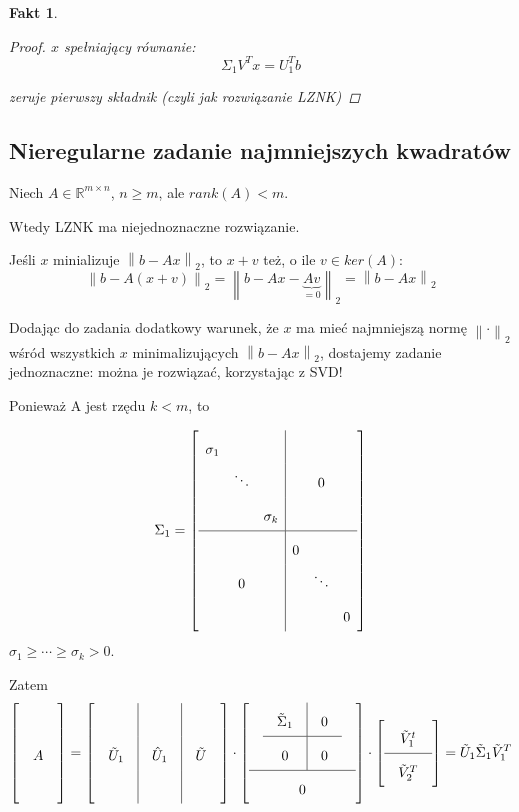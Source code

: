 \documentclass[hidelinks,a4paper,fleqn,oneside]{book}
\newcommand{\RR}{\mathbb{R}}
\newcommand{\norm}[1]{\left\lVert#1\right\rVert}
\newtheorem{fakt}{Fakt}
\begin{document}
\begin{fakt}
\begin{enumerate}
\begin{proof}
		      $x$ spełniający równanie:
		      \[
		      	\Sigma_1V^Tx = U_1^Tb
		      \]
		      
		      zeruje pierwszy składnik (czyli jak rozwiązanie LZNK)
		      \end{proof}
	\end{enumerate}
\end{fakt}

\subsection{Nieregularne zadanie najmniejszych kwadratów}

Niech $A \in \RR^{m \times n}$, $n \geq m$, ale $rank(A) < m$.

Wtedy LZNK ma niejednoznaczne rozwiązanie.

Jeśli $x$ minializuje $\norm{b - Ax}_2$, to $x+v$ też, o ile $v \in ker(A)$:
\[
	\norm{b - A(x + v)}_2 = \norm{b - Ax - \underbrace{Av}_{=0}}_2 = \norm{b - Ax}_2
\]

Dodając do zadania dodatkowy warunek, że $x$ ma mieć najmniejszą normę $\norm{\cdot}_2$ wśród wszystkich $x$ minimalizujących $\norm{b - Ax}_2$, dostajemy zadanie jednoznaczne: można je rozwiązać, korzystając z SVD!

Ponieważ A jest rzędu $k<m$, to 

\[
	\Sigma_1 = \left[ \begin{array}{ccc|ccc}
		\sigma_1 &  &  &  &  & \\ 
		&  \ddots &  &  & 0  & \\ 
		&  & \sigma_k  &  &  & \\ 
		\hline
		&  & &  0 &  & \\ 
		&  0 &  &  & \ddots & \\ 
		&  &  &  &  & 0
	\end{array} \right]
\]
$\sigma_1 \geq \cdots \geq \sigma_k > 0$.

Zatem
\[\arraycolsep=1em\def\arraystretch{2}
	\left[\begin{array}{c} \\ A \\ \ \end{array}\right] =
	\left[\begin{array}{c|c|c} & &\ \\ \tilde{U}_1 & \hat{U}_1 & \tilde{U} \\ & & \ \end{array}\right] \cdot \left[ \begin{array}{c} \begin{array}{c|c} \tilde{\Sigma}_1 & 0 \\ \hline 0 & 0 \end{array} \\ \hline 0\end{array}\right] \cdot \left[ \begin{array}{c} \tilde{V}_1^t \\ \hline \tilde{V}_2^T \end{array}\right] = \tilde{U}_1 \tilde{\Sigma}_1 \tilde{V}_1^T
\]
\end{document}
